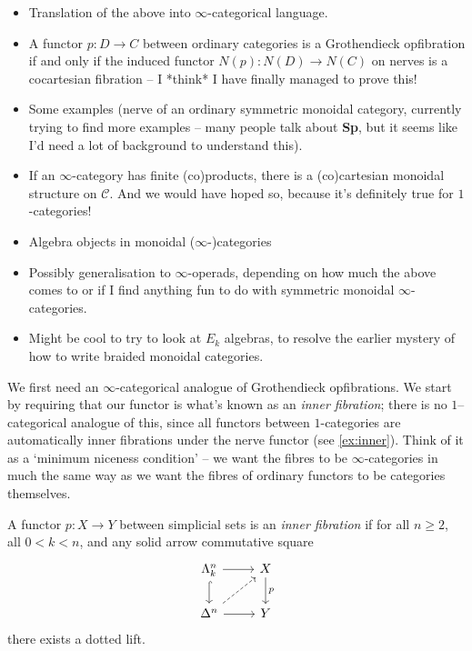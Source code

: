 \documentclass{MetricNotes2023}
\begin{document}
\begin{itemize}
\item Translation of the above into \(\infty\)-categorical language.
\item A functor \(p : D \to C\) between ordinary categories is a Grothendieck opfibration if and only if the induced functor \(N(p) : N(D) \to N(C)\) on nerves is a cocartesian fibration -- I *think* I have finally managed to prove this!
\item Some examples (nerve of an ordinary symmetric monoidal category, currently trying to find more examples -- many people talk about \textbf{Sp}, but it seems like I'd need a lot of background to understand this).
\item If an \(\infty\)-category has finite (co)products, there is a (co)cartesian monoidal structure on \(\mathcal{C}\). And we would have hoped so, because it's definitely true for \(1\)-categories!
\item Algebra objects in monoidal (\(\infty\)-)categories
\item Possibly generalisation to \(\infty\)-operads, depending on how much the above comes to or if I find anything fun to do with symmetric monoidal \(\infty\)-categories. 
\item Might be cool to try to look at \(E_k\) algebras, to resolve the earlier mystery of how to write braided monoidal categories.
\end{itemize}

We first need an \(\infty\)-categorical analogue of Grothendieck opfibrations. We start by requiring that our functor is what's known as an \textit{inner fibration}; there is no \(1\)--categorical analogue of this, since all functors between \(1\)-categories are automatically inner fibrations under the nerve functor (see \ref{ex:inner}). Think of it as a `minimum niceness condition' -- we want the fibres to be \(\infty\)-categories in much the same way as we want the fibres of ordinary functors to be categories themselves. 

\begin{definition}
A functor \(p : X \to Y\) between simplicial sets is an \textit{inner fibration} if for all \(n \geq 2\), all \(0 < k < n\), and any solid arrow commutative square 
\[\begin{tikzcd}
\Lambda^n_k \arrow[r, ""] \arrow[d, hookrightarrow, swap, ""]  & X \arrow[d, "p"]  \\
\Delta^n \arrow[r, swap, ""] \arrow[ur, dashrightarrow, swap, ""]  & Y
\end{tikzcd}\]
there exists a dotted lift. 
\end{definition}
\end{document}
